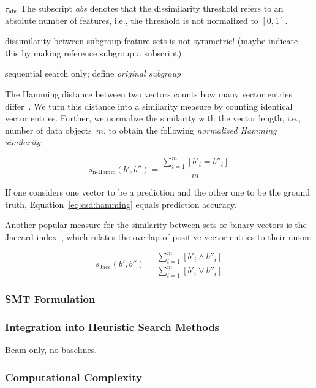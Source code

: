 \documentclass{article}
\theoremstyle{definition}
\begin{document}
$\tau_{\text{abs}}$
The subscript \emph{abs} denotes that the dissimilarity threshold refers to an absolute number of features, i.e., the threshold is not normalized to $[0,1]$.

dissimilarity between subgroup feature sets is not symmetric! (maybe indicate this by making reference subgroup a subscript)

sequential search only; define \emph{original subgroup}

The Hamming distance between two vectors counts how many vector entries differ~\cite{choi2010survey}.
We turn this distance into a similarity measure by counting identical vector entries.
Further, we normalize the similarity with the vector length, i.e., number of data objects~$m$, to obtain the following \emph{normalized Hamming similarity}:

\begin{equation}
	s_{\text{n-Hamm}}(b', b'') = \frac{\sum_{i=1}^{m} [b'_i = b''_i]}{m}
	\label{eq:csd:hamming}
\end{equation}

If one considers one vector to be a prediction and the other one to be the ground truth, Equation~\ref{eq:csd:hamming} equals prediction accuracy.

Another popular measure for the similarity between sets or binary vectors is the Jaccard index~\cite{choi2010survey}, which relates the overlap of positive vector entries to their union:

\begin{equation}
	s_{\text{Jacc}}(b', b'') = \frac{\sum_{i=1}^{m} [b'_i \land b''_i ]}{\sum_{i=1}^{m} [b'_i \lor b''_i]}
	\label{eq:csd:jaccard}
\end{equation}

\subsubsection{SMT Formulation}
\label{sec:csd:approach:alternatives:smt}

\subsubsection{Integration into Heuristic Search Methods}
\label{sec:csd:approach:alternatives:heuristics}

Beam only, no baselines.

\subsubsection{Computational Complexity}
\label{sec:csd:approach:alternatives:complexity}
\end{document}
